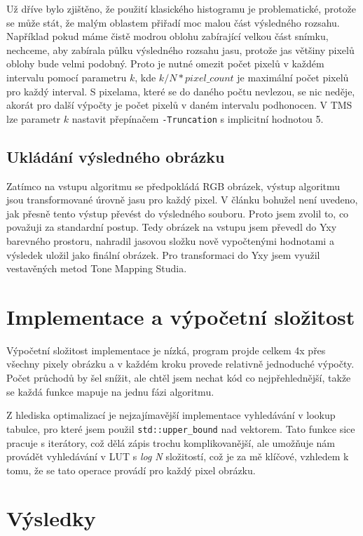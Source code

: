 \documentclass[11pt,a4paper,oneside]{article}
\begin{document}
Už dříve bylo zjištěno, že použití klasického histogramu je problematické,
protože se může stát, že malým oblastem přiřadí moc malou část výsledného
rozsahu.
Například pokud máme čistě modrou oblohu zabírající velkou část snímku,
nechceme, aby zabírala půlku výsledného rozsahu jasu, protože jas většiny pixelů
oblohy bude velmi podobný. Proto je nutné
omezit počet pixelů v každém intervalu pomocí parametru $ k $, kde
$k/N*pixel\_count$ je maximální počet pixelů pro každý interval. S pixelama, které
se do daného počtu nevlezou, se nic neděje, akorát pro další výpočty je počet
pixelů v daném intervalu podhonocen. V TMS lze parametr $ k $ nastavit přepínačem
\texttt{-Truncation} s implicitní hodnotou 5.

\subsection{Ukládání výsledného obrázku}

Zatímco na vstupu algoritmu se předpokládá RGB obrázek, výstup algoritmu jsou
transformované úrovně jasu pro každý pixel. V článku bohužel není uvedeno, jak
přesně tento výstup převést do výsledného souboru. Proto jsem zvolil to, co
považuji za standardní postup. Tedy obrázek na vstupu jsem převedl do Yxy barevného
prostoru, nahradil jasovou složku nově vypočtenými hodnotami a výsledek uložil
jako finální obrázek. Pro transformaci do Yxy jsem využil vestavěných metod
Tone Mapping Studia.

\section{Implementace a výpočetní složitost}

Výpočetní složitost implementace je nízká, program projde celkem 4x
přes všechny pixely obrázku a v každém kroku provede relativně jednoduché výpočty. 
Počet průchodů by šel snížit, ale chtěl jsem nechat kód co nejpřehlednější,
takže se každá funkce mapuje na jednu fázi algoritmu.

Z hlediska optimalizací je nejzajímavější implementace vyhledávání v lookup
tabulce, pro které jsem použil \texttt{std::upper\_bound} nad vektorem.
Tato funkce sice pracuje s iterátory, což dělá zápis trochu komplikovanější,
ale umožňuje nám provádět vyhledávání v LUT s \emph{log N} složitostí,
což je za mě klíčové, vzhledem k tomu, že se tato operace provádí pro každý
pixel obrázku.

\section{Výsledky}
\end{document}
